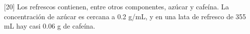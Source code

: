 [20] Los refrescos contienen, entre otros componentes, azúcar y cafeína.
La concentración de azúcar es cercana a 0.2 g/mL, y en una lata de refresco de 355 mL hay casi 0.06 g de cafeína.

\begin{parts}
    
    
\end{parts}